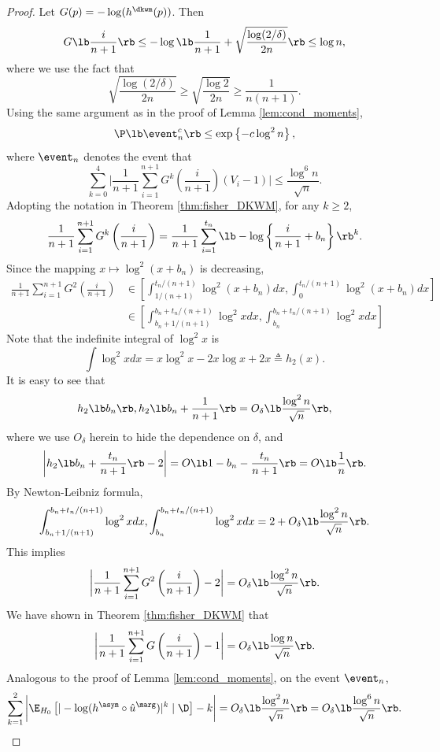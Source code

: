 \begin{proof}
  Let $G(p) = -\log (h^\dkwm(p))$. Then
  \begin{equation}
    \label{eq:G_upper_dkwm}
    G\lb\frac{i}{n+1}\rb\le -\log\lb \frac{1}{n+1} + \sqrt{\frac{\log(2/ \delta)}{2n}}\rb\le \log n,
  \end{equation}
  where we use the fact that
  \[\sqrt{\frac{\log(2/ \delta)}{2n}}\ge \sqrt{\frac{\log 2}{2n}}\ge \frac{1}{n(n+1)}.\]
  Using the same argument as in the proof of Lemma \ref{lem:cond_moments},
  \[\P\lb \event_n^c\rb \le \exp \left\{-c\log^2 n\right\},\]
  where $\event_n$ denotes the event that
  \[\sum_{k=0}^{4}\bigg|\frac{1}{n+1}\sum_{i=1}^{n+1}G^k\left(\frac{i}{n+1}\right)(V_{i} - 1)\bigg|\le \frac{\log^6 n}{\sqrt{n}}.\]
Adopting the notation in Theorem \ref{thm:fisher_DKWM}, for any $k \ge 2$,
  \begin{align*}
    \frac{1}{n+1}\sum_{i=1}^{n+1}G^k\left(\frac{i}{n+1}\right) = \frac{1}{n+1}\sum_{i=1}^{t_n} \lb -\log \left\{\frac{i}{n+1} + b_n\right\}\rb^{k}.
  \end{align*}
  Since the mapping $x\mapsto \log^2(x + b_n)$ is decreasing,
  \begin{align*}
    \frac{1}{n+1}\sum_{i=1}^{n+1}G^2\left(\frac{i}{n+1}\right)&\in \left[\int_{1/(n + 1)}^{t_n / (n + 1)}\log^2 (x + b_n)dx, \int_{0}^{t_n / (n + 1)}\log^2 (x + b_n)dx\right]\\
                                                              & \in \left[\int_{b_n + 1/(n + 1)}^{b_n + t_n / (n + 1)}\log^2 xdx, \int_{b_n}^{b_n + t_n / (n + 1)}\log^2 xdx\right]
  \end{align*}
  Note that the indefinite integral of $\log^2 x$ is
  \[\int \log^2 xdx = x\log^2 x - 2x\log x + 2x \triangleq h_2(x).\]
  It is easy to see that
  \[h_2\lb b_n\rb, h_2\lb b_n + \frac{1}{n+1}\rb = O_{\delta}\lb\frac{\log^2 n}{\sqrt{n}}\rb,\]
  where we use $O_{\delta}$ herein to hide the dependence on $\delta$, and
  \[\bigg|h_2\lb b_n + \frac{t_n}{n+1}\rb - 2\bigg| = O\lb 1 - b_n - \frac{t_n}{n+1}\rb = O\lb\frac{1}{n}\rb.\]
  By Newton-Leibniz formula,
  \[\int_{b_n+1/(n+1)}^{b_n + t_n / (n + 1)}\log^2 xdx, \int_{b_n}^{b_n + t_n / (n + 1)}\log^2 xdx = 2 + O_{\delta}\lb\frac{\log^2 n}{\sqrt{n}}\rb.\]
  This implies
  \[\bigg|\frac{1}{n+1}\sum_{i=1}^{n+1}G^2\left(\frac{i}{n+1}\right) - 2 \bigg| = O_{\delta}\lb\frac{\log^2 n}{\sqrt{n}}\rb.\]
  We have shown in Theorem \ref{thm:fisher_DKWM} that
  \[\bigg|\frac{1}{n+1}\sum_{i=1}^{n+1}G\left(\frac{i}{n+1}\right) - 1 \bigg| = O_{\delta}\lb\frac{\log n}{\sqrt{n}}\rb.\]
  Analogous to the proof of Lemma \ref{lem:cond_moments}, on the event $\event_{n}$,
  \[\sum_{k=1}^{2}\bigg|\E_{H_0}\left[|-\log (h^\asym \circ \hat{u}^\marg)|^k\mid \D\right] - k\bigg| = O_{\delta}\lb\frac{\log^2 n}{\sqrt{n}}\rb = O_{\delta}\lb\frac{\log^6 n}{\sqrt{n}}\rb.\]


\end{proof}
